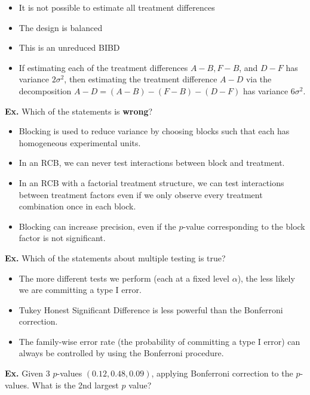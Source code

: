 \begin{itemize}
	\item[$\square$] It is not possible to estimate all treatment differences
	\item[$\square$] The design is balanced
	\item[$\square$] This is an unreduced BIBD
	\item[$\boxtimes$] If estimating each of the treatment differences $A - B, F - B$, and $D - F$ has variance $2 \sigma^2$, then estimating the treatment difference $A - D$ via the decomposition $A - D = (A -B) - (F - B) - (D - F)$ has variance $6 \sigma^2$.
\end{itemize}


\hrulefill

\textbf{Ex.} Which of the statements is \textbf{wrong}?
\begin{itemize}
	\item[$\square$] Blocking is used to reduce variance by choosing blocks such that each has homogeneous experimental units.
	\item[$\boxtimes$] In an RCB, we can never test interactions between block and treatment.
	\item[$\square$] In an RCB with a factorial treatment structure, we can test interactions between treatment factors even if we only observe every treatment combination once in each block.
	\item[$\square$] Blocking can increase precision, even if the $p$-value corresponding to the block factor is not significant.
\end{itemize}


\hrulefill

\textbf{Ex.} Which of the statements about multiple testing is true?
\begin{itemize}
	\item[$\square$] The more different tests we perform (each at a fixed level $\alpha$), the less likely we are committing a type I error.
	\item[$\square$] Tukey Honest Significant Difference is less powerful than the Bonferroni correction.
	\item[$\boxtimes$] The family-wise error rate (the probability of committing a type I error) can always be controlled by using the Bonferroni procedure. 
\end{itemize}


\hrulefill

\textbf{Ex.} Given 3 $p$-values $(0.12, 0.48, 0.09)$, applying Bonferroni correction to the $p$-values. What is the 2nd largest $p$ value?

